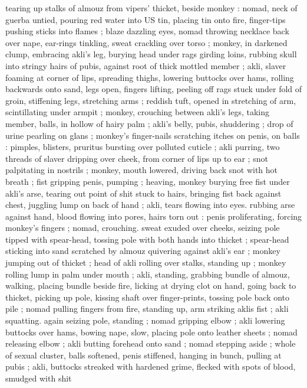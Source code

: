 tearing up stalks of almouz from vipers' thicket, beside monkey : 
nomad, neck of guerba untied, pouring red water into US tin, placing 
tin onto fire, finger-tips pushing sticks into flames ; blaze dazzling 
eyes, nomad throwing necklace back over nape, ear-rings tinkling, 
sweat crackling over torso ; monkey, in darkened clump, embracing 
akli's leg, burying head under rags girding loins, rubbing skull into 
stringy hairs of pubis, against root of thick mottled member ; akli, 
slaver foaming at corner of lips, spreading thighs, lowering buttocks 
over hams, rolling backwards onto sand, legs open, fingers lifting, 
peeling off rags stuck under fold of groin, stiffening legs, stretching 
arms ; reddish tuft, opened in stretching of arm, scintillating under 
armpit ; monkey, crouching between akli's legs, taking member, balls, 
in hollow of hairy palm ; akli's belly, pubis, shuddering ; drop of 
urine pearling on glans ; monkey's finger-nails scratching itches on 
penis, on balls : pimples, blisters, pruritus bursting over polluted 
cuticle ; akli purring, two threads of slaver dripping over cheek, from 
corner of lips up to ear ; snot palpitating in nostrils ; monkey, mouth 
lowered, driving back snot with hot breath ; fist gripping penis, 
pumping ; heaving, monkey burying free fist under akli's arse, 
tearing out point of shit stuck to hairs, bringing fist back against 
chest, juggling lump on back of hand ; akli, tears flowing into eyes. 
rubbing arse against hand, blood flowing into pores, hairs torn out : 
penis proliferating, forcing monkey's fingers ; nomad, crouching. 
sweat exuded over cheeks, seizing pole tipped with spear-head, 
tossing pole with both hands into thicket ; spear-head sticking into 
sand scratched by almouz quivering against akli's ear ; monkey 
jumping out of thicket ; head of akli rolling over stalks, standing up 
; monkey rolling lump in palm under mouth ; akli, standing, grabbing 
bundle of almouz, walking, placing bundle beside fire, licking at 
drying clot on hand, going back to thicket, picking up pole, kissing 
shaft over finger-prints, tossing pole back onto pile ; nomad pulling 
fingers from fire, standing up, arm striking aklis fist ; akli squatting. 
again seizing pole, standing ; nomad gripping elbow ; akli lowering 
buttocks over hams, bowing nape, slow, placing pole onto leather 
sheets ; nomad releasing elbow ; akli butting forehead onto sand ; 
nomad stepping aside ; whole of sexual cluster, balls softened, penis 
stiffened, hanging in bunch, pulling at pubis ; akli, buttocks streaked 
with hardened grime, flecked with spots of blood, smudged with shit 
